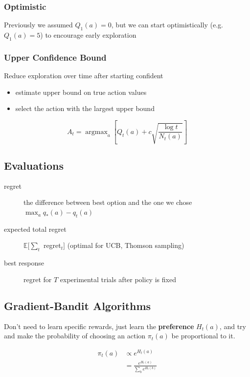 \documentclass[]{article}
\theoremstyle{definition}
\newcommand{\E}{\mathbb{E}}
\DeclareMathOperator*{\argmax}{argmax}
\begin{document}
\subsubsection{Optimistic}
\label{ssub:optimistic}
Previously we assumed $Q_1(a) = 0$, but we can start optimistically (e.g. $Q_1(a) = 5$) to encourage early exploration

\subsubsection{Upper Confidence Bound}
\label{ssub:upper_confidence_bound}
Reduce exploration over time after starting confident
\begin{itemize}
    \item estimate upper bound on true action values
    \item select the action with the largest upper bound
\end{itemize}

\begin{equation*}
    A_t = \argmax_a [Q_t(a) + c \sqrt{\frac{\log t}{N_t(a)}}]
\end{equation*}

\subsection{Evaluations}
\label{sub:evaluations}
\begin{description}
    \item[regret] the difference between best option and the one we chose $\max_a q_*(a) - q_t(a)$
    \item[expected total regret] $\E[\sum_t $ regret$_t]$ (optimal for UCB, Thomson sampling)
    \item[best response] regret for $T$ experimental trials after policy is fixed
\end{description}


\subsection{Gradient-Bandit Algorithms}
\label{sub:gradient_bandit_algorithms}

Don't need to learn specific rewards, just learn the \textbf{preference} $H_t(a)$, and try and make the probability of choosing an action $\pi_t(a)$ be proportional to it.

\begin{eqnarray*}
    \pi_t(a) &\propto e^{H_t(a)} \\
             &= \frac{e^{H_t(a)}}{\sum_b e^{H_t(b)}}
\end{eqnarray*}
\end{document}
